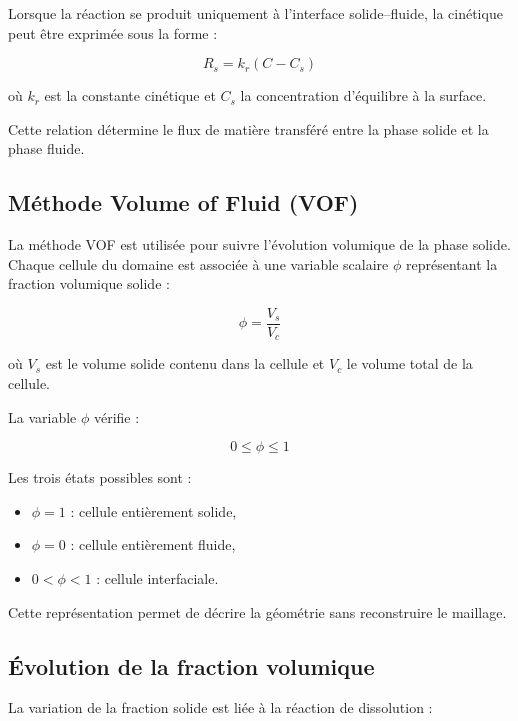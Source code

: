 \documentclass[12pt,a4paper]{report}
\begin{document}
Lorsque la réaction se produit uniquement à l’interface solide--fluide, la cinétique peut être exprimée sous la forme :

\begin{equation}
R_s
=
k_r(C-C_s)
\end{equation}

où $k_r$ est la constante cinétique et $C_s$ la concentration d’équilibre à la surface.

Cette relation détermine le flux de matière transféré entre la phase solide et la phase fluide.

\subsection{Méthode Volume of Fluid (VOF)}

La méthode VOF est utilisée pour suivre l’évolution volumique de la phase solide. Chaque cellule du domaine est associée à une variable scalaire $\phi$ représentant la fraction volumique solide :

\begin{equation}
\phi
=
\frac{V_s}{V_c}
\end{equation}

où $V_s$ est le volume solide contenu dans la cellule et $V_c$ le volume total de la cellule.

La variable $\phi$ vérifie :

\begin{equation}
0 \leq \phi \leq 1
\end{equation}

Les trois états possibles sont :

\begin{itemize}
\item $\phi = 1$ : cellule entièrement solide,
\item $\phi = 0$ : cellule entièrement fluide,
\item $0<\phi<1$ : cellule interfaciale.
\end{itemize}

Cette représentation permet de décrire la géométrie sans reconstruire le maillage.

\subsection{Évolution de la fraction volumique}

La variation de la fraction solide est liée à la réaction de dissolution :
\end{document}

